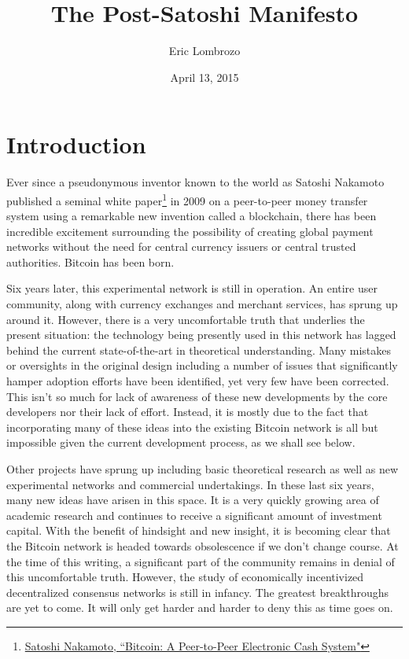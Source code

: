 \documentclass{article}
\title{The Post-Satoshi Manifesto}
\author{Eric Lombrozo}
\date{April 13, 2015}
\begin{document}
\maketitle

\section*{Introduction}

Ever since a pseudonymous inventor known to the world as Satoshi Nakamoto published a seminal white paper\footnote{\href{https://bitcoin.org/bitcoin.pdf}{Satoshi Nakamoto, ``Bitcoin: A Peer-to-Peer Electronic Cash System"}} in 2009 on a peer-to-peer money transfer system using a remarkable new invention called a blockchain, there has been incredible excitement surrounding the possibility of creating global payment networks without the need for central currency issuers or central trusted authorities. Bitcoin has been born.

Six years later, this experimental network is still in operation. An entire user community, along with currency exchanges and merchant services, has sprung up around it. However, there is a very uncomfortable truth that underlies the present situation: the technology being presently used in this network has lagged behind the current state-of-the-art in theoretical understanding. Many mistakes or oversights in the original design including a number of issues that significantly hamper adoption efforts have been identified, yet very few have been corrected. This isn't so much for lack of awareness of these new developments by the core developers nor their lack of effort. Instead, it is mostly due to the fact that incorporating many of these ideas into the existing Bitcoin network is all but impossible given the current development process, as we shall see below.

Other projects have sprung up including basic theoretical research as well as new experimental networks and commercial undertakings. In these last six years, many new ideas have arisen in this space. It is a very quickly growing area of academic research and continues to receive a significant amount of investment capital. With the benefit of hindsight and new insight, it is becoming clear that the Bitcoin network is headed towards obsolescence if we don't change course. At the time of this writing, a significant part of the community remains in denial of this uncomfortable truth. However, the study of economically incentivized decentralized consensus networks is still in infancy. The greatest breakthroughs are yet to come. It will only get harder and harder to deny this as time goes on.
\end{document}
